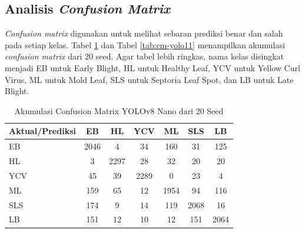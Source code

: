 \begin{sectioncontent}
    \subsection{Analisis \textit{Confusion Matrix}}
    \begin{subsectioncontent}
        \hspace{\parindent}\textit{Confusion matrix} digunakan untuk melihat sebaran prediksi benar dan salah pada setiap kelas. Tabel \ref{tab:cm-yolov8} dan Tabel \ref{tab:cm-yolo11} menampilkan akumulasi \textit{confusion matrix} dari 20 seed. Agar tabel lebih ringkas, nama kelas disingkat menjadi EB untuk Early Blight, HL untuk Healthy Leaf, YCV untuk Yellow Curl Virus, ML untuk Mold Leaf, SLS untuk Septoria Leaf Spot, dan LB untuk Late Blight.

        \begin{table}[H]
            \centering
            \caption{Akumulasi Confusion Matrix YOLOv8 Nano dari 20 Seed}
            \label{tab:cm-yolov8}
            \begin{tabular}{|l|c|c|c|c|c|c|}
                \hline
                \textbf{Aktual/Prediksi} & \textbf{EB} & \textbf{HL} & \textbf{YCV} & \textbf{ML} & \textbf{SLS} & \textbf{LB} \\
                \hline
                EB & 2046 & 4 & 34 & 160 & 31 & 125 \\
                \hline
                HL & 3 & 2297 & 28 & 32 & 20 & 20 \\
                \hline
                YCV & 45 & 39 & 2289 & 0 & 23 & 4 \\
                \hline
                ML & 159 & 65 & 12 & 1954 & 94 & 116 \\
                \hline
                SLS & 174 & 9 & 14 & 119 & 2068 & 16 \\
                \hline
                LB & 151 & 12 & 10 & 12 & 151 & 2064 \\
                \hline
            \end{tabular}
        \end{table}


\end{subsectioncontent}
\end{sectioncontent}
